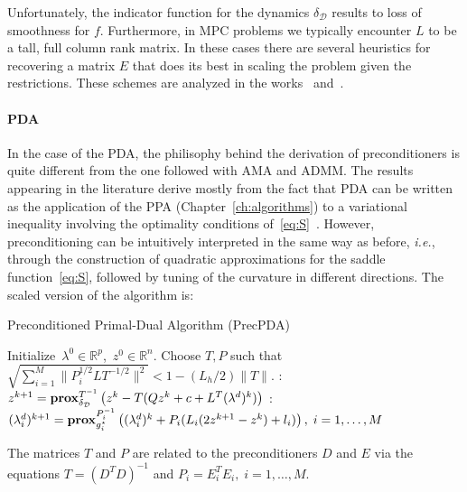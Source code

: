 \documentclass[openany]{now}
\newcommand{\ie}{{\it i.e.}}
\newcommand{\reals}{{\mathbb R}}
\newcommand{\prox}{\mathop{\bf prox}}
\begin{document}
Unfortunately, the indicator function for the dynamics $\delta_\mathcal{D}$ results to loss of smoothness for $f$. Furthermore, in MPC problems we typically encounter $L$ to be a tall, full column rank matrix. In these cases there are several heuristics for recovering a matrix $E$ that does its best in scaling the problem given the restrictions. These schemes are analyzed in the works \cite{ghadimi2013optimal}~and~\cite{giselsson2014metric}.

\paragraph*{PDA} In the case of the PDA, the philisophy behind the derivation of preconditioners is quite different from the one followed with AMA and ADMM. The results appearing in the literature derive mostly from the fact that PDA can be written as the application of the PPA (Chapter~\ref{ch:algorithms}) to a variational inequality involving the optimality conditions of~\eqref{eq:S}~\cite{he2012convergence}. However, preconditioning can be intuitively interpreted in the same way as before, \ie, through the construction of quadratic approximations for the saddle function~\eqref{eq:S}, followed by tuning of the curvature in different directions. The scaled version of the algorithm is:
\begin{algorithm}[H]
\caption{Preconditioned Primal-Dual Algorithm (PrecPDA)}
\label{al:PrecPDA}
\begin{algorithmic} 
\REQUIRE \mbox{Initialize $\lambda^{0}\in \reals^{p}$, $z^0\in\reals^n$.} Choose $T,P$ such that $\sqrt{\sum_{i=1}^M\|P_i^{1/2}LT^{-1/2}\|^2} < 1-(L_h/2)\|T\|$.
\LOOP
  : $z^{k+1} = \prox^{T^{-1}}_{\delta_\mathcal{D}}\left(z^k-T(Qz^k+c+L^T(\lambda^d)^k)\right)$
  : $(\lambda^d_i)^{k+1} = \prox^{P_i^{-1}}_{g_i^\star}\left((\lambda^d_i)^k+P_i(L_i(2z^{k+1}-z^k)+l_i)\right), \; i=1,\ldots,M$
\ENDLOOP
\end{algorithmic}
\end{algorithm}\begin{footnotesize}
\end{footnotesize}
The matrices $T$ and $P$ are related to the preconditioners $D$ and $E$ via the equations $T=(D^TD)^{-1}$ and $P_i=E_i^TE_i, \; i=1,\ldots,M$.
\end{document}

